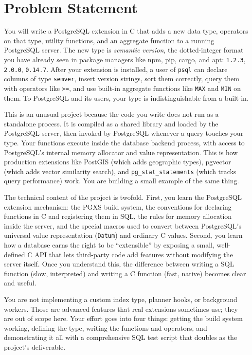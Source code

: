 \documentclass[11pt,a4paper]{article}
\begin{document}

\section{Problem Statement}

You will write a PostgreSQL extension in C that adds a new data type, operators on that type, utility functions, and an aggregate function to a running PostgreSQL server. The new type is \textit{semantic version}, the dotted-integer format you have already seen in package managers like npm, pip, cargo, and apt: \texttt{1.2.3}, \texttt{2.0.0}, \texttt{0.14.7}. After your extension is installed, a user of \texttt{psql} can declare columns of type \texttt{semver}, insert version strings, sort them correctly, query them with operators like \texttt{>=}, and use built-in aggregate functions like \texttt{MAX} and \texttt{MIN} on them. To PostgreSQL and its users, your type is indistinguishable from a built-in.

This is an unusual project because the code you write does not run as a standalone process. It is compiled as a shared library and loaded by the PostgreSQL server, then invoked by PostgreSQL whenever a query touches your type. Your functions execute inside the database backend process, with access to PostgreSQL's internal memory allocator and value representation. This is how production extensions like PostGIS (which adds geographic types), pgvector (which adds vector similarity search), and \texttt{pg\_stat\_statements} (which tracks query performance) work. You are building a small example of the same thing.

The technical content of the project is twofold. First, you learn the PostgreSQL extension mechanism: the PGXS build system, the conventions for declaring functions in C and registering them in SQL, the rules for memory allocation inside the server, and the special macros used to convert between PostgreSQL's universal value representation (\texttt{Datum}) and ordinary C values. Second, you learn how a database earns the right to be ``extensible'' by exposing a small, well-defined C API that lets third-party code add features without modifying the server itself. Once you understand this, the difference between writing a SQL function (slow, interpreted) and writing a C function (fast, native) becomes clear and useful.

You are not implementing a custom index type, planner hooks, or background workers. Those are advanced features that real extensions sometimes use; they are out of scope here. Your effort goes into four things: getting the build system working, defining the type, writing the functions and operators, and demonstrating it all with a comprehensive SQL test script that doubles as the project's deliverable.
\end{document}
